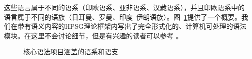 \noindent
	这些语言属于不同的语系（印欧语系、亚非语系、汉藏语系），并且印欧语系中的语言属于不同的语族（日耳曼、罗曼、印度--伊朗语族）。图~\ref{fig-lang-fams}提供了一个概要。我们在带有语义内容的HPSG\indexhpsgc 理论框架内写出了完全形式化的、计算机可处理的语法模块。在这里不会讨论细节，但是有兴趣的读者可以参考 。
%
\begin{figure}
\caption{核心语法项目涵盖的语系和语支}\label{fig-lang-fams}
\end{figure}%


